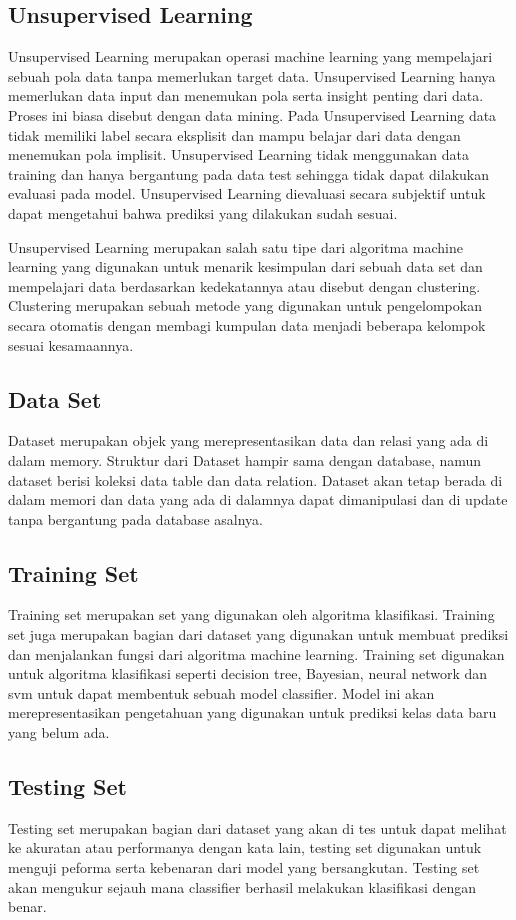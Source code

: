     \subsection{Unsupervised Learning}
    Unsupervised Learning merupakan operasi machine learning yang mempelajari sebuah pola data tanpa memerlukan target data. Unsupervised Learning hanya memerlukan data input dan menemukan pola serta insight penting dari data. Proses ini biasa disebut dengan data mining. Pada Unsupervised Learning data tidak memiliki label secara eksplisit dan mampu belajar dari data dengan menemukan pola implisit. Unsupervised Learning tidak menggunakan data training dan hanya bergantung pada data test sehingga tidak dapat dilakukan evaluasi pada model. Unsupervised Learning dievaluasi secara subjektif untuk dapat mengetahui bahwa prediksi yang dilakukan sudah sesuai. 

    Unsupervised Learning merupakan salah satu tipe dari algoritma machine learning yang digunakan untuk menarik kesimpulan dari sebuah data set dan mempelajari data berdasarkan kedekatannya atau disebut dengan clustering. Clustering merupakan sebuah metode yang digunakan untuk pengelompokan secara otomatis dengan membagi kumpulan data menjadi beberapa kelompok sesuai kesamaannya.

    \subsection{Data Set}
    Dataset merupakan objek yang merepresentasikan data dan relasi yang ada di dalam memory. Struktur dari Dataset hampir sama dengan database, namun dataset berisi koleksi data table dan data relation. Dataset akan tetap berada di dalam memori dan data yang ada di dalamnya dapat dimanipulasi dan di update tanpa bergantung pada database asalnya.

    \subsection{Training Set}
    Training set merupakan set yang digunakan oleh algoritma klasifikasi. Training set juga merupakan bagian dari dataset yang digunakan untuk membuat prediksi dan menjalankan fungsi dari algoritma machine learning. Training set digunakan untuk algoritma klasifikasi seperti decision tree, Bayesian, neural network dan svm untuk dapat membentuk sebuah model classifier. Model ini akan merepresentasikan pengetahuan yang digunakan untuk prediksi kelas data baru yang belum ada. 

    \subsection{Testing Set}
    Testing set merupakan bagian dari dataset yang akan di tes untuk dapat melihat ke akuratan atau performanya dengan kata lain, testing set digunakan untuk menguji peforma serta kebenaran dari model yang bersangkutan. Testing set akan mengukur sejauh mana classifier berhasil melakukan klasifikasi dengan benar. 